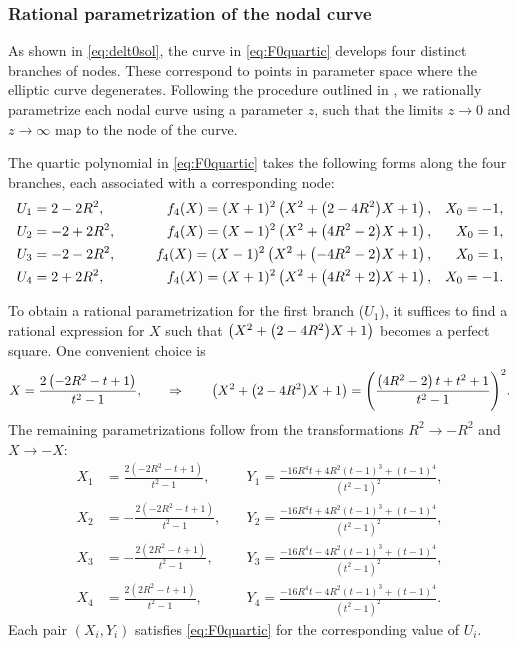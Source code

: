 \documentclass[11pt, a4paper]{article}
\numberwithin{equation}{section}
\begin{document}
\subsubsection{Rational parametrization of the nodal curve}

As shown in \cref{eq:delt0sol}, the curve in \cref{eq:F0quartic} develops four distinct branches of nodes. These correspond to points in parameter space where the elliptic curve degenerates. Following the procedure outlined in \cite{kerr2008}, we rationally parametrize each nodal curve using a parameter $z$, such that the limits $z \to 0$ and $z \to \infty$ map to the node of the curve.

The quartic polynomial in \cref{eq:F0quartic} takes the following forms along the four branches, each associated with a corresponding node:
\begin{equation}
  \begin{aligned}
    U_1 &= 2 - 2R^2, &\qquad f_4(X) = (X+1)^2 \left(X^2 + \qty(2-4 R^2) X+1\right), && X_0 = -1, \\
    U_2 &= -2 + 2R^2, &\qquad f_4(X) = (X-1)^2 \left(X^2 + \qty(4 R^2-2) X+1\right), && X_0 = 1, \\
    U_3 &= -2 - 2R^2, &\qquad f_4(X) = (X-1)^2 \left(X^2+ \qty(-4 R^2-2) X+1\right), && X_0 = 1, \\
    U_4 &= 2 + 2 R^2, &\qquad f_4(X) = (X+1)^2 \left(X^2+\qty(4 R^2+2) X+1\right), && X_0 = -1.
  \end{aligned}
\end{equation}

To obtain a rational parametrization for the first branch ($U_1$), it suffices to find a rational expression for $X$ such that $\left(X^2 + \qty(2-4 R^2) X+1\right)$ becomes a perfect square. One convenient choice is
\begin{equation}
  X = \frac{2 \left(-2 R^2-t+1\right)}{t^2-1},
  \qquad
  \Rightarrow \qquad
  \left(X^2 + \qty(2-4 R^2) X+1\right) = 
  \qty(\frac{\left(4 R^2-2\right) t+t^2+1}{t^2-1})^2.
\end{equation}
The remaining parametrizations follow from the transformations $R^2 \to -R^2$ and $X \to -X$:
\begin{equation}
\begin{aligned}
  X_1 &= \frac{2 \left(-2 R^2-t+1\right)}{t^2-1}, &\quad
  Y_1 = \frac{-16 R^4 t+4 R^2 (t-1)^3+(t-1)^4}{\left(t^2-1\right)^2}, \\
  X_2 &= -\frac{2 \left(-2 R^2-t+1\right)}{t^2-1}, &\quad
  Y_2 = \frac{-16 R^4 t+4 R^2 (t-1)^3+(t-1)^4}{\left(t^2-1\right)^2}, \\
  X_3 &= -\frac{2 \left(2 R^2-t+1\right)}{t^2-1}, &\quad
  Y_3 = \frac{-16 R^4 t-4 R^2 (t-1)^3+(t-1)^4}{\left(t^2-1\right)^2}, \\
  X_4 &= \frac{2 \left(2 R^2-t+1\right)}{t^2-1}, &\quad
  Y_4 = \frac{-16 R^4 t-4 R^2 (t-1)^3+(t-1)^4}{\left(t^2-1\right)^2}.
\end{aligned}
\end{equation}
Each pair $(X_i, Y_i)$ satisfies \cref{eq:F0quartic} for the corresponding value of $U_i$.
\end{document}
